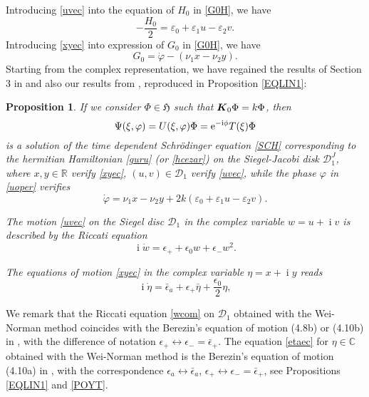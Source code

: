 \documentclass[12pt]{amsart}
\numberwithin{equation}{section}
\newtheorem{Proposition}{Proposition}
\theoremstyle{definition}
\begin{document}
Introducing \eqref{uvec} into the equation of $H_0$ in \eqref{G0H}, we have
\begin{equation}\label{H00}
-\frac{H_0}{2}=\varepsilon_0+\varepsilon_1u-\varepsilon_2v.
\end{equation}
Introducing \eqref{xyec} into expression of $G_0$ in  \eqref{G0H}, we have
\begin{equation}\label{GOOH}
G_0=\dot{\varphi}-(\nu_1x-\nu_2y).
\end{equation}
Starting from the complex representation, we have regained  the
results of Section 3 in \cite{cezar} and also our results from
\cite{nou}, reproduced in Proposition \ref{EQLIN1}:
\begin{Proposition}\label{main}
If we consider $\Phi\in{\ensuremath{{{\mathfrak{{H}}}}}}$ such that ${{\mbox{\boldmath{${K}$}}}}_0\Phi=k\Phi$, then
\begin{equation}\label{SCHCEZ}
\Psi(\xi,\varphi)=U(\xi,\varphi)\Phi= {{\mbox{\rm e}}}^{-{\operatorname{i}}\phi}T(\xi)\Phi\end{equation} is a solution of the time
dependent Schr\"odinger equation \eqref{SCH} corresponding to the
hermitian Hamiltonian \eqref{guru} (or \eqref{hcezar}) on the
Siegel-Jacobi disk ${{\mathcal{{D}}}}^J_1$, where $x,y\in{\ensuremath{\mathbb{R}}}$ verify \eqref{xyec},
$(u,v)\in{{\mathcal{{D}}}}_1$ verify \eqref{uvec}, while the phase $\varphi$ in \eqref{uoper}
verifies 
\begin{equation}\label{phicez}
\dot{\varphi}=\nu_1x-\nu_2y+2k(\varepsilon_0+\varepsilon_1u-\varepsilon_2v).
\end{equation}

The motion \eqref{uvec} on the Siegel disc ${{\mathcal{{D}}}}_1$
in the 
  complex variable $w=u+{\operatorname{i}} v$ is described by the Riccati equation 
\begin{equation}\label{wcom}
{\operatorname{i}} \dot{w}= \epsilon_++\epsilon_0 w+\epsilon_-w^2.
\end{equation}
 

The equations of motion \eqref{xyec} in 
 the complex variable $\eta= x+{\operatorname{i}} y$ reads
\begin{equation}\label{etaec}
{\operatorname{i}} \dot{\eta}=\bar{\epsilon}_a+\epsilon_+\bar{\eta}+\frac{\epsilon_0}{2}\eta,
\end{equation}
\end{Proposition}

We remark that 
 the Riccati equation \eqref{wcom} on ${{\mathcal{{D}}}}_1$ obtained with the Wei-Norman method
 coincides with the Berezin's equation of motion {\rm{(4.8b)}}  or
 {\rm{(4.10b)}}   in \cite{FC}, with the
difference of notation $\epsilon_+\leftrightarrow
\epsilon_-=\bar{\epsilon}_+$.  
The equation \eqref{etaec} for $\eta\in{\ensuremath{\mathbb{C}}}$ obtained with the Wei-Norman method is the
Berezin's equation of motion {\rm{(4.10a)}}    in
\cite{FC},  with the
correspondence $\epsilon_a\leftrightarrow
\bar{\epsilon}_a$,  $\epsilon_+\leftrightarrow
\epsilon_-=\bar{\epsilon}_+$, see Propositions \ref{EQLIN1} and  \ref{POYT}.
\end{document}

